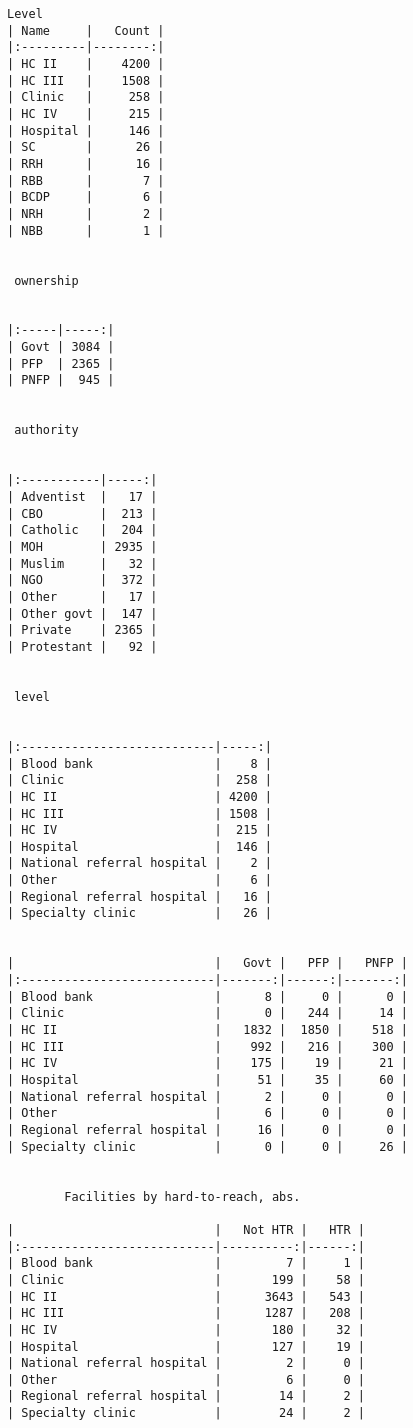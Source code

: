 \documentclass[11pt]{article}
\begin{document}
\begin{Verbatim}[commandchars=\\\{\}]
Level
| Name     |   Count |
|:---------|--------:|
| HC II    |    4200 |
| HC III   |    1508 |
| Clinic   |     258 |
| HC IV    |     215 |
| Hospital |     146 |
| SC       |      26 |
| RRH      |      16 |
| RBB      |       7 |
| BCDP     |       6 |
| NRH      |       2 |
| NBB      |       1 |


 ownership 


|:-----|-----:|
| Govt | 3084 |
| PFP  | 2365 |
| PNFP |  945 |


 authority 


|:-----------|-----:|
| Adventist  |   17 |
| CBO        |  213 |
| Catholic   |  204 |
| MOH        | 2935 |
| Muslim     |   32 |
| NGO        |  372 |
| Other      |   17 |
| Other govt |  147 |
| Private    | 2365 |
| Protestant |   92 |


 level 


|:---------------------------|-----:|
| Blood bank                 |    8 |
| Clinic                     |  258 |
| HC II                      | 4200 |
| HC III                     | 1508 |
| HC IV                      |  215 |
| Hospital                   |  146 |
| National referral hospital |    2 |
| Other                      |    6 |
| Regional referral hospital |   16 |
| Specialty clinic           |   26 |


|                            |   Govt |   PFP |   PNFP |
|:---------------------------|-------:|------:|-------:|
| Blood bank                 |      8 |     0 |      0 |
| Clinic                     |      0 |   244 |     14 |
| HC II                      |   1832 |  1850 |    518 |
| HC III                     |    992 |   216 |    300 |
| HC IV                      |    175 |    19 |     21 |
| Hospital                   |     51 |    35 |     60 |
| National referral hospital |      2 |     0 |      0 |
| Other                      |      6 |     0 |      0 |
| Regional referral hospital |     16 |     0 |      0 |
| Specialty clinic           |      0 |     0 |     26 |


        Facilities by hard-to-reach, abs.         

|                            |   Not HTR |   HTR |
|:---------------------------|----------:|------:|
| Blood bank                 |         7 |     1 |
| Clinic                     |       199 |    58 |
| HC II                      |      3643 |   543 |
| HC III                     |      1287 |   208 |
| HC IV                      |       180 |    32 |
| Hospital                   |       127 |    19 |
| National referral hospital |         2 |     0 |
| Other                      |         6 |     0 |
| Regional referral hospital |        14 |     2 |
| Specialty clinic           |        24 |     2 |



\end{Verbatim}
\end{document}
